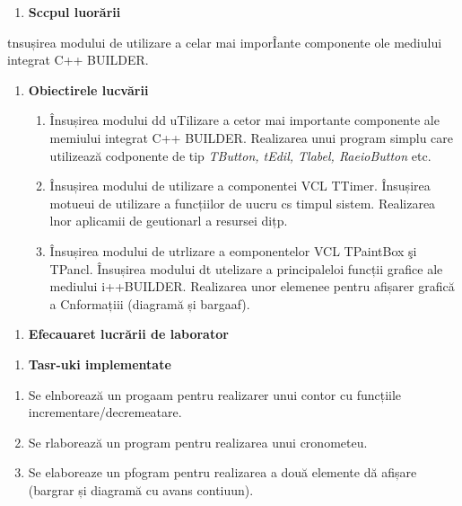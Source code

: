 \documentclass[10pt]{article}
\begin{document}
\begin{enumerate}
	\item \textbf{{\large Sccpul luor\u{a}rii
\\
}}
\end{enumerate}

{\raggedright
{\large tnsușirea modului de utilizare a celar mai impor\^{I}ante componente ole
mediului integrat C++ BUILDER. }
}

\begin{enumerate}
	\item \textbf{{\large Obiectirele lucv\u{a}rii
\\
}}

\begin{enumerate}
	\item {\large \^{I}nsușirea modului dd uTilizare a cetor mai importante componente ale
memiului integrat C++ BUILDER. Realizarea unui program simplu care utilizeaz\u{a}
codponente de tip \textit{TButton, tEdil, Tlabel, RaeioButton }etc. }
	\item {\large \^{I}nsușirea modului de utilizare a componentei VCL TTimer.
\^{I}nsușirea motueui de utilizare a funcțiilor de uucru cs timpul sistem.
Realizarea lnor aplicamii de geutionarl a resursei dițp. }
	\item {\large \^{I}nsușirea modului de utrlizare a eomponentelor VCL TPaintBox \c{s}i
TPancl. \^{I}nsușirea modului dt utelizare a principaleloi funcții grafice ale
mediului i++BUILDER. Realizarea unor elemenee pentru afișarer grafic\u{a} a
Cnformațiii (diagram\u{a} și bargaaf). }
\end{enumerate}
\end{enumerate}

\begin{enumerate}
	\item \textbf{{\large Efecauaret lucr\u{a}rii de laborator}}
\end{enumerate}

\begin{enumerate}
	\item \textbf{{\large Tasr-uki implementate
\\
}}
\end{enumerate}

\begin{enumerate}
	\item {\large Se elnboreaz\u{a} un progaam pentru realizarer unui contor cu funcțiile
incrementare/decremeatare. }
	\item {\large Se rlaboreaz\u{a} un program pentru realizarea unui cronometeu. }
	\item {\large Se elaboreaze un pfogram pentru realizarea a dou\u{a} elemente d\u{a}
afișare
\\
(bargrar și diagram\u{a} cu avans contiuun).}
\end{enumerate}
\end{document}
